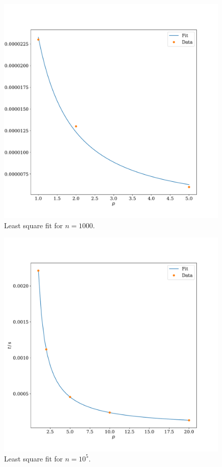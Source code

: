 \documentclass[a4paper, 11pt]{article}
\begin{document}
\begin{figure}
  \centering
  \includegraphics[width=\textwidth]{../trapezoid/plot/fit_1000.pdf}
  \caption{Least square fit for $n=1000$.}
  \label{fig:fit_1000}
\end{figure}
\begin{figure}
  \centering
  \includegraphics[width=\textwidth]{../trapezoid/plot/fit_100000.pdf}
  \caption{Least square fit for $n=10^{5}$.}
  \label{fig:fit_100k}
\end{figure}
\end{document}
